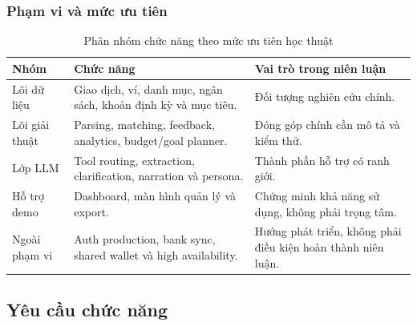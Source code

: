 \subsubsection{Phạm vi và mức ưu tiên}

\begin{table}[H]
  \centering
  \caption{Phân nhóm chức năng theo mức ưu tiên học thuật}
  \label{tab:function-groups}
  \begin{tabularx}{\textwidth}{@{}L{3.4cm}Y Y@{}}
    \toprule
    \textbf{Nhóm} & \textbf{Chức năng} & \textbf{Vai trò trong niên luận} \\
    \midrule
    Lõi dữ liệu & Giao dịch, ví, danh mục, ngân sách, khoản định kỳ và mục tiêu. & Đối tượng nghiên cứu chính. \\
    Lõi giải thuật & Parsing, matching, feedback, analytics, budget/goal planner. & Đóng góp chính cần mô tả và kiểm thử. \\
    Lớp LLM & Tool routing, extraction, clarification, narration và persona. & Thành phần hỗ trợ có ranh giới. \\
    Hỗ trợ demo & Dashboard, màn hình quản lý và export. & Chứng minh khả năng sử dụng, không phải trọng tâm. \\
    Ngoài phạm vi & Auth production, bank sync, shared wallet và high availability. & Hướng phát triển, không phải điều kiện hoàn thành niên luận. \\
    \bottomrule
  \end{tabularx}
\end{table}

\subsection{Yêu cầu chức năng}

